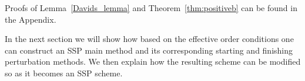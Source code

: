 %
%
%

Proofs of Lemma~\ref{Davids_lemma} and Theorem~\ref{thm:positiveb} can be found in the Appendix.

In the next section we will show how based on the effective order conditions one can construct an SSP main method and its corresponding starting and finishing perturbation methods. We then explain how the resulting scheme can be modified so as it becomes an SSP scheme. 